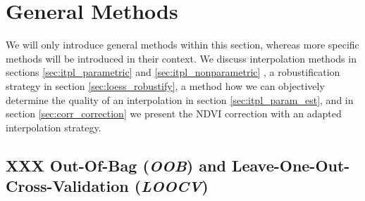 \section{General Methods}{
	We will only introduce general methods within this section, whereas more specific methods will be introduced in their context. We discuss interpolation methods in sections \ref{sec:itpl_parametric} and \ref{sec:itpl_nonparametric} , a robustification strategy in section \ref{sec:loess_robustify}, a method how we can objectively determine the quality of an interpolation in section \ref{sec:itpl_param_est}, and in section \ref{sec:corr_correction} we present the NDVI correction with an adapted interpolation strategy.

	\subsection{XXX Out-Of-Bag (\textit{OOB}) and Leave-One-Out-Cross-Validation (\textit{LOOCV})}{
		\label{sec:OOB_LOOCV}
	}
}

